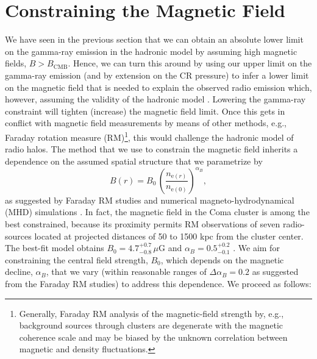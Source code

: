 \documentclass[12pt,manuscript]{aastex}
\newcommand{\rmn}{\mathrm}
\begin{document}
\section{Constraining the Magnetic Field}
\label{sec:B}
We have seen in the previous section that we can obtain an absolute lower limit on the gamma-ray emission in the hadronic model by assuming high magnetic fields, $B>B_\rmn{CMB}$. Hence, we can turn this around by using our upper limit on the gamma-ray emission (and by extension on the CR pressure) to infer a lower limit on the magnetic field that is needed to explain the observed radio emission which, however, assuming the validity of the hadronic model \citep{article:PfrommerEnsslin:2004a}. Lowering the gamma-ray constraint will tighten (increase) the magnetic field limit. Once this gets in conflict with magnetic field measurements by means of other methods, e.g., Faraday rotation measure (RM)\footnote{Generally, Faraday RM analysis of the magnetic-field strength by, e.g., background sources through clusters are degenerate with the magnetic coherence scale and may be biased by the unknown correlation between magnetic and density fluctuations.}, this would challenge the hadronic model of radio halos. The method that we use to constrain the magnetic field inherits a dependence on the assumed spatial structure that we parametrize by
\begin{equation}
\label{eq:B}
B(r) = B_{0} \,\left(\frac{n_{\rmn{e}(r)}}{n_{\rmn{e}(0)}}\right)^{\alpha_B},
\end{equation}
as suggested by Faraday RM studies and numerical magneto-hydrodynamical (MHD) simulations \citep[][and references therein]{article:Bonafede_etal:2010, article:Bonafede_etal:2011}. In fact, the magnetic field in the Coma cluster is among the best constrained, because its proximity permits RM observations of 
seven radio-sources located at projected distances of 50 to 1500 kpc from the cluster center. The best-fit model obtains $B_{0} = 4.7^{+0.7}_{-0.8}\,\mu$G and $\alpha_{B} = 0.5^{+0.2}_{-0.1}$ \citep{article:Bonafede_etal:2010}. We aim for constraining the central field strength, $B_{0}$, which depends on the magnetic decline, $\alpha_{B}$, that we vary (within reasonable ranges of $\Delta\alpha_{B}=0.2$ as suggested from the Faraday RM studies) to address this dependence. We proceed as follows:
\end{document}
